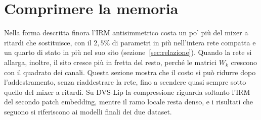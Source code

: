 
\section{Comprimere la memoria}
\label{sec:compressione}

Nella forma descritta finora l'IRM antisimmetrico costa un po' più del mixer a ritardi che sostituisce, con il $2{,}5\%$ di parametri in più nell'intera rete compatta e un quarto di stato in più nel suo sito (sezione~\ref{sec:relazione}). Quando la rete si allarga, inoltre, il sito cresce più in fretta del resto, perché le matrici $W_k$ crescono con il quadrato dei canali. Questa sezione mostra che il costo si può ridurre dopo l'addestramento, senza riaddestrare la rete, fino a scendere quasi sempre sotto quello del mixer a ritardi. Su DVS-Lip la compressione riguarda soltanto l'IRM del secondo patch embedding, mentre il ramo locale resta denso, e i risultati che seguono si riferiscono ai modelli finali dei due dataset.

